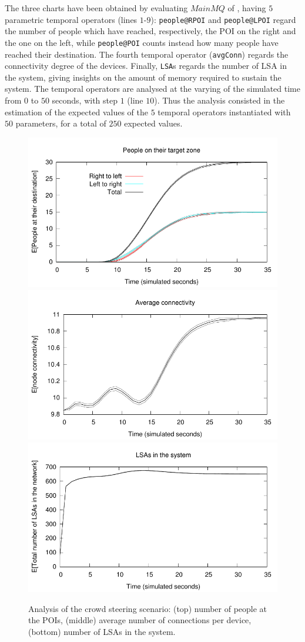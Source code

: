 \documentclass[12pt,a4paper,twoside,openright]{book}
\begin{document}
The three charts have been obtained by evaluating $MainMQ$ of , having $5$ parametric temporal operators (lines $1$-$9$):
%
\texttt{people@RPOI} and \texttt{people@LPOI} regard the number of people which have reached, respectively, the POI on the right and the one on the left, while \texttt{people@POI} counts instead how many people have reached their destination. The fourth temporal operator (\texttt{avgConn}) regards the connectivity degree of the devices. Finally, \texttt{LSA}s regards the number of LSA in the system, giving insights on the amount of memory required to sustain the system.
%
The temporal operators are analysed at the varying of the simulated time from $0$ to $50$ seconds, with step $1$ (line $10$). Thus the analysis consisted in the estimation of the expected values of the $5$ temporal operators instantiated with $50$ parameters, for a total of $250$ expected values. 

\begin{figure}
\begin{center}
\vspace{-0.2cm}
\includegraphics[width=0.7\columnwidth]{img/people}
\includegraphics[width=0.7\columnwidth]{img/connectivity}
\includegraphics[width=0.7\columnwidth]{img/lsas}
\caption[Analysis of a crowd steering scenario with \alchemist{} and \multivesta]{Analysis of the crowd steering scenario: (top) number of people at the POIs, (middle) average number of connections per device, (bottom) number of LSAs in the system.}
\label{img:analysisCharts}
\end{center}
\end{figure}
\end{document}
